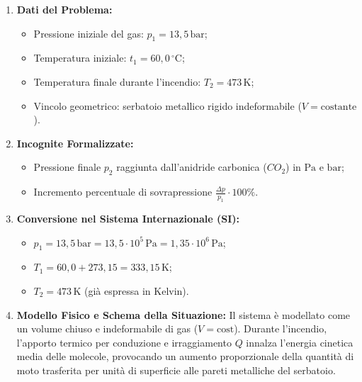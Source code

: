 \documentclass[11pt,a4paper,oneside]{report}
\begin{document}
\begin{problema}
\begin{enumerate}[label=\textbf{Fase \arabic*:}, leftmargin=*, itemsep=5pt]
  \item \textbf{Dati del Problema:}
  \begin{itemize}[leftmargin=*, label=\textbullet]
    \item Pressione iniziale del gas: $p_1 = 13{,}5\,\text{bar}$;
    \item Temperatura iniziale: $t_1 = 60{,}0\,{^\circ}\text{C}$;
    \item Temperatura finale durante l'incendio: $T_2 = 473\,\text{K}$;
    \item Vincolo geometrico: serbatoio metallico rigido indeformabile ($V = \text{costante}$).
  \end{itemize}

  \item \textbf{Incognite Formalizzate:}
  \begin{itemize}[leftmargin=*, label=\textbullet]
    \item Pressione finale $p_2$ raggiunta dall'anidride carbonica ($CO_2$) in $\text{Pa}$ e $\text{bar}$;
    \item Incremento percentuale di sovrapressione $\frac{\Delta p}{p_1} \cdot 100\%$.
  \end{itemize}

  \item \textbf{Conversione nel Sistema Internazionale (SI):}
  \begin{itemize}[leftmargin=*, label=\textbullet]
    \item $p_1 = 13{,}5\,\text{bar} = 13{,}5 \cdot 10^5\,\text{Pa} = 1{,}35 \cdot 10^6\,\text{Pa}$;
    \item $T_1 = 60{,}0 + 273{,}15 = 333{,}15\,\text{K}$;
    \item $T_2 = 473\,\text{K}$ (gi\`a espressa in Kelvin).
  \end{itemize}

  \item \textbf{Modello Fisico e Schema della Situazione:}
  Il sistema \`e modellato come un volume chiuso e indeformabile di gas ($V = \text{cost}$). Durante l'incendio, l'apporto termico per conduzione e irraggiamento $Q$ innalza l'energia cinetica media delle molecole, provocando un aumento proporzionale della quantit\`a di moto trasferita per unit\`a di superficie alle pareti metalliche del serbatoio.
  \begin{center}
\end{center}
\end{enumerate}
\end{problema}
\end{document}
